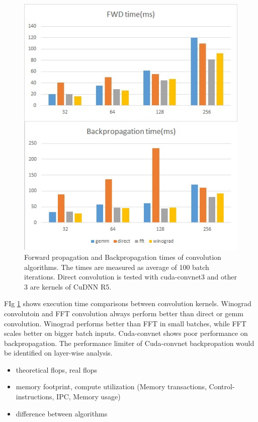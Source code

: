 \documentclass[conference]{IEEEtran}
\begin{document}
\begin{figure}
  \centering
  \includegraphics[width=\linewidth]{./figures/conv_time}
  \caption{Forward propagation and Backpropagation times of convolution algorithms. The times are measured as average of 100 batch iterations. 
Direct convolution is tested with cuda-convnet3 and other 3 are kernels of CuDNN R5. }
  \label{fig_conv_time}
\end{figure}

FIg \ref{fig_conv_time} shows execution time comparisons between convolution kernels.
Winograd convolutoin and FFT convolution always perform better than direct or gemm convolution.
Winograd performs better than FFT in small batches, while FFT scales better on bigger batch inputs.
Cuda-convnet shows poor performance on backpropagation.
The performance limiter of Cuda-convnet backpropation would be identified on layer-wise analysis.



\begin{itemize}
  \item theoretical flops, real flops
  \item memory footprint, compute utilization (Memory transactions, Control-instructions, IPC, Memory usage)
  \item difference between algorithms
\end{itemize}
\end{document}
